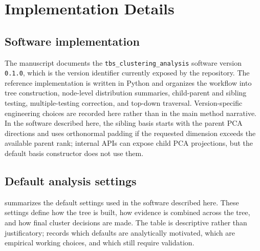 
\section{Implementation Details}

\subsection{Software implementation}
\label{sec:software-implementation}

The manuscript documents the \texttt{tbs\_clustering\_analysis} software version
\texttt{0.1.0}, which is the version identifier currently exposed by the
repository. The reference implementation is written in Python and organizes the
workflow into tree construction, node-level distribution summaries,
child-parent and sibling testing, multiple-testing correction, and top-down
traversal. Version-specific engineering choices are recorded here rather than
in the main method narrative. In the software described here, the sibling basis
starts with the parent PCA directions and uses orthonormal padding if the
requested dimension exceeds the available parent rank; internal APIs can expose
child PCA projections, but the default basis constructor does not use them.

\subsection{Default analysis settings}

 summarizes the default settings used in the software
described here. These settings define how the tree is built, how evidence is
combined across the tree, and how final cluster decisions are made. The table
is descriptive rather than justificatory;  records
which defaults are analytically motivated, which are empirical working choices,
and which still require validation.

